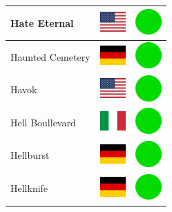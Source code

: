 \documentclass[12pt, a4paper, twoside]{report}
\begin{document}
\begin{center}
\begin{longtable}{|p{5cm}|p{2cm}|p{2cm}|}
Hate Eternal & \includegraphics[width=1cm]{4x3/us} & \includegraphics[width=1cm]{likes/y} \\ \hline
Haunted Cemetery & \includegraphics[width=1cm]{4x3/de} & \includegraphics[width=1cm]{likes/y} \\ \hline
Havok & \includegraphics[width=1cm]{4x3/us} & \includegraphics[width=1cm]{likes/y} \\ \hline
Hell Boullevard & \includegraphics[width=1cm]{4x3/it} & \includegraphics[width=1cm]{likes/y} \\ \hline
Hellburst & \includegraphics[width=1cm]{4x3/de} & \includegraphics[width=1cm]{likes/y} \\ \hline
Hellknife & \includegraphics[width=1cm]{4x3/de} & \includegraphics[width=1cm]{likes/y} \\ \hline

\end{longtable}
\end{center}
\end{document}
